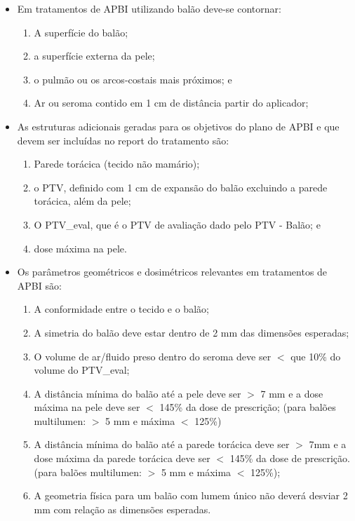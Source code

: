 \documentclass[11pt,a4paper]{article}
\newcounter{exemplo}
\begin{document}
\begin{exemplo}[8. Braquiterapia]
\begin{itemize}
        \item Em tratamentos de APBI utilizando balão deve-se contornar:
        
            \begin{enumerate}[label=\roman*.]
                \item A superfície do balão;
                \item a superfície externa da pele;
                \item o pulmão ou os arcos-costais mais próximos; e
                \item Ar ou seroma contido em 1 cm de distância partir do aplicador;
            \end{enumerate}
        
        \item As estruturas adicionais geradas para os objetivos do plano de APBI e que devem ser incluídas no report do tratamento são: 
        
            \begin{enumerate}[label=\roman*.]
                \item Parede torácica (tecido não mamário);
                \item o PTV, definido com 1 cm de expansão do balão excluindo a parede torácica, além da pele;
                \item O PTV\_eval, que é o PTV de avaliação dado pelo PTV - Balão; e
                \item dose máxima na pele.
            \end{enumerate}
        
        \item Os parâmetros geométricos e dosimétricos relevantes em tratamentos de APBI são:
        
            \begin{enumerate}[label=\roman*.]
                \item A conformidade entre o tecido e o balão;
                \item A simetria do balão deve estar dentro de 2 mm das dimensões esperadas;
                \item O volume de ar/fluido preso dentro do seroma deve ser $<$ que 10\% do volume do PTV\_eval;
                \item A distância mínima do balão até a pele deve ser $>$ 7 mm e a dose máxima na pele deve ser $<$ 145\% da dose de prescrição; (para balões multilumen: $>$ 5 mm e máxima $<$ 125\%) 
                \item A distância mínima do balão até a parede torácica deve ser $>$ 7mm e a dose máxima da parede torácica deve ser $<$ 145\% da dose de prescrição. (para balões multilumen: $>$ 5 mm e máxima $<$ 125\%);
                \item A geometria física para um balão com lumem único não deverá desviar 2 mm com relação as dimensões esperadas.
            \end{enumerate}


\end{itemize}
\end{exemplo}
\end{document}
